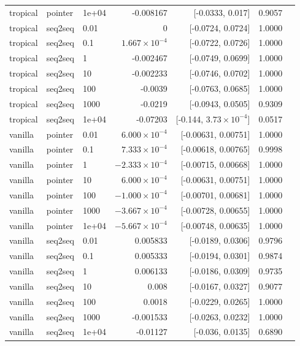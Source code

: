 \documentclass[10pt]{article}
\begin{document}
{\begin{longtable}{lllrrrl}
tropical & pointer & 1e+04 & -0.008167 & [-0.0333, 0.017] & 0.9057 & \\
tropical & seq2seq & 0.01 & 0 & [-0.0724, 0.0724] & 1.0000 & \\
tropical & seq2seq & 0.1 & $1.667\times10^{-4}$ & [-0.0722, 0.0726] & 1.0000 & \\
tropical & seq2seq & 1 & -0.002467 & [-0.0749, 0.0699] & 1.0000 & \\
tropical & seq2seq & 10 & -0.002233 & [-0.0746, 0.0702] & 1.0000 & \\
tropical & seq2seq & 100 & -0.0039 & [-0.0763, 0.0685] & 1.0000 & \\
tropical & seq2seq & 1000 & -0.0219 & [-0.0943, 0.0505] & 0.9309 & \\
tropical & seq2seq & 1e+04 & -0.07203 & [-0.144, $3.73\times10^{-4}$] & 0.0517 & \\
vanilla & pointer & 0.01 & $6.000\times10^{-4}$ & [-0.00631, 0.00751] & 1.0000 & \\
vanilla & pointer & 0.1 & $7.333\times10^{-4}$ & [-0.00618, 0.00765] & 0.9998 & \\
vanilla & pointer & 1 & $-2.333\times10^{-4}$ & [-0.00715, 0.00668] & 1.0000 & \\
vanilla & pointer & 10 & $6.000\times10^{-4}$ & [-0.00631, 0.00751] & 1.0000 & \\
vanilla & pointer & 100 & $-1.000\times10^{-4}$ & [-0.00701, 0.00681] & 1.0000 & \\
vanilla & pointer & 1000 & $-3.667\times10^{-4}$ & [-0.00728, 0.00655] & 1.0000 & \\
vanilla & pointer & 1e+04 & $-5.667\times10^{-4}$ & [-0.00748, 0.00635] & 1.0000 & \\
vanilla & seq2seq & 0.01 & 0.005833 & [-0.0189, 0.0306] & 0.9796 & \\
vanilla & seq2seq & 0.1 & 0.005333 & [-0.0194, 0.0301] & 0.9874 & \\
vanilla & seq2seq & 1 & 0.006133 & [-0.0186, 0.0309] & 0.9735 & \\
vanilla & seq2seq & 10 & 0.008 & [-0.0167, 0.0327] & 0.9077 & \\
vanilla & seq2seq & 100 & 0.0018 & [-0.0229, 0.0265] & 1.0000 & \\
vanilla & seq2seq & 1000 & -0.001533 & [-0.0263, 0.0232] & 1.0000 & \\
vanilla & seq2seq & 1e+04 & -0.01127 & [-0.036, 0.0135] & 0.6890 & \\
\bottomrule
\end{longtable}
}
\end{document}
